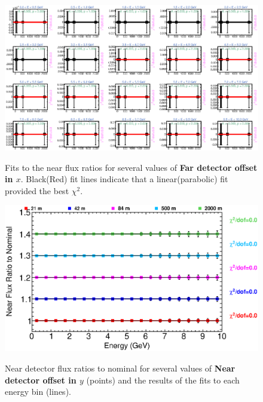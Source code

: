 {\begin{figure}[ht]
  \begin{center}
    {\includegraphics[width=5.0in]{figures/LBNEFDX_near_fits.eps}}
  \end{center}
\caption{ Fits to the near flux ratios for several values of {\bf Far detector offset in $x$}. Black(Red) fit lines indicate that a linear(parabolic) fit provided the best $\chi^2$. }
\end{figure}

\begin{figure}[ht]
  \begin{center}
    {\includegraphics[width=6.0in]{figures/LBNEFDY_near_summary.eps}}
  \end{center}
\caption{ Near detector flux ratios to nominal for several values of {\bf Near detector offset in $y$} (points) and the results of the fits to each energy bin (lines).}
\end{figure}

}
